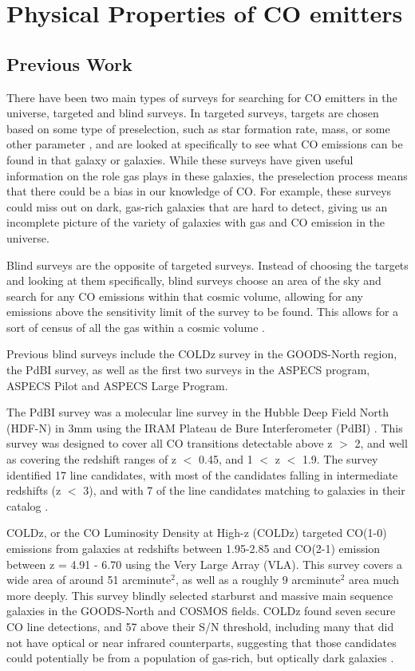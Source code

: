 \chapter{Physical Properties of CO emitters}

\section{Previous Work}

There have been two main types of surveys for searching for CO emitters in the universe, targeted and blind surveys. In targeted surveys, targets are chosen based on some type of preselection, such as star formation rate, mass, or some other parameter \cite{walter2016alma, decarli2019alma}, and are looked at specifically to see what CO emissions can be found in that galaxy or galaxies. While these surveys have given useful information on the role gas plays in these galaxies, the preselection process means that there could be a bias in our knowledge of CO. For example, these surveys could miss out on dark, gas-rich galaxies that are hard to detect, giving us an incomplete picture of the variety of galaxies with gas and CO emission in the universe. 

Blind surveys are the opposite of targeted surveys. Instead of choosing the targets and looking at them specifically, blind surveys choose an area of the sky and search for any CO emissions within that cosmic volume, allowing for any emissions above the sensitivity limit of the survey to be found. This allows for a sort of census of all the gas within a cosmic volume \cite{decarli2019alma}. 

Previous blind surveys include the COLDz survey in the GOODS-North region, the PdBI survey, as well as the first two surveys in the ASPECS program, ASPECS Pilot and ASPECS Large Program. 

The PdBI survey was a molecular line survey in the Hubble Deep Field North (HDF-N) in 3mm using the IRAM Plateau de Bure Interferometer (PdBI) \cite{decarli2014molecular}. This survey was designed to cover all CO transitions detectable above z $>$ 2, and well as covering the redshift ranges of z $<$ 0.45, and 1 $<$ z $<$ 1.9. The survey identified 17 line candidates, with most of the candidates falling in intermediate redshifts (z $<$ 3), and with 7 of the line candidates matching to galaxies in their catalog \cite{decarli2014molecular}. 

COLDz, or the CO Luminosity Density at High-z (COLDz) targeted CO(1-0) emissions from galaxies at redshifts between 1.95-2.85 and CO(2-1) emission between z = 4.91 - 6.70 using the Very Large Array (VLA)\cite{pavesi2018co}. This survey covers a wide area of around 51 arcminute$^2$, as well as a roughly 9 arcminute$^2$ area much more deeply. This survey blindly selected starburst and massive main sequence galaxies in the GOODS-North and COSMOS fields. COLDz found seven secure CO line detections, and 57 above their S/N threshold, including many that did not have optical or near infrared counterparts, suggesting that those candidates could potentially be from a population of gas-rich, but optically dark galaxies \cite{pavesi2018co}.

